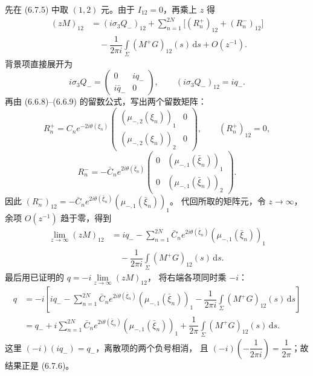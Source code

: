 \documentclass[lang=cn,scheme=chinese,mode=simple,device=normal,color=blue,
math=cm,thmcnt=section,12pt]{elegantbook}
\newcommand{\dd}{\,\mathrm{d}}
\begin{document}
\begin{callout}[计算：由 (6.7.5) 推导位势重构公式 (6.7.6)]
    先在 (6.7.5) 中取 $(1,2)$ 元。由于 $I_{12}=0$，再乘上 $z$ 得
    \[
        \begin{aligned}
            (zM)_{12}
             & =(i\sigma_3Q_-)_{12}
            +\sum\limits_{n=1}^{2N}\bigl[(R_n^+)_{12}+(R_n^-)_{12}\bigr]               \\
             & \quad-\dfrac{1}{2\pi i}\int\limits_\Sigma(M^+G)_{12}(s)\dd s+O(z^{-1}).
        \end{aligned}
    \]
    背景项直接展开为
    \[
        i\sigma_3Q_-=\begin{pmatrix}0&iq_-\\i\bar q_-&0\end{pmatrix},
        \qquad (i\sigma_3Q_-)_{12}=iq_-.
    \]
    再由 (6.6.8)--(6.6.9) 的留数公式，写出两个留数矩阵：
    \[
        R_n^+=C_ne^{-2i\theta(\xi_n)}
        \begin{pmatrix}
            (\mu_{-,2}(\xi_n))_1 & 0 \\(\mu_{-,2}(\xi_n))_2&0
        \end{pmatrix},\qquad (R_n^+)_{12}=0,
    \]
    \[
        R_n^-=-\bar C_ne^{2i\theta(\bar\xi_n)}
        \begin{pmatrix}
            0 & (\mu_{-,1}(\bar\xi_n))_1 \\0&(\mu_{-,1}(\bar\xi_n))_2
        \end{pmatrix}.
    \]
    因此 $(R_n^-)_{12}=-\bar C_ne^{2i\theta(\bar\xi_n)}(\mu_{-,1}(\bar\xi_n))_1$。
    代回所取的矩阵元，令 $z\to\infty$，余项 $O(z^{-1})$ 趋于零，得到
    \[
        \begin{aligned}
            \lim\limits_{z\to\infty}(zM)_{12}
             & =iq_--\sum\limits_{n=1}^{2N}\bar C_ne^{2i\theta(\bar\xi_n)}
            (\mu_{-,1}(\bar\xi_n))_1                                         \\
             & \quad-\dfrac{1}{2\pi i}\int\limits_\Sigma(M^+G)_{12}(s)\dd s.
        \end{aligned}
    \]
    最后用已证明的 $q=-i\displaystyle\lim\limits_{z\to\infty}(zM)_{12}$，
    将右端各项同时乘 $-i$：
    \[
        \begin{aligned}
            q & =-i\left[iq_--\sum\limits_{n=1}^{2N}\bar C_ne^{2i\theta(\bar\xi_n)}
                (\mu_{-,1}(\bar\xi_n))_1
            -\dfrac{1}{2\pi i}\int\limits_\Sigma(M^+G)_{12}(s)\dd s\right]          \\
              & =q_-+i\sum\limits_{n=1}^{2N}\bar C_ne^{2i\theta(\bar\xi_n)}
            (\mu_{-,1}(\bar\xi_n))_1
            +\dfrac{1}{2\pi}\int\limits_\Sigma(M^+G)_{12}(s)\dd s.
        \end{aligned}
    \]
    这里 $(-i)(iq_-)=q_-$，离散项的两个负号相消，
    且 $(-i)\left(-\dfrac{1}{2\pi i}\right)=\dfrac{1}{2\pi}$；故结果正是 (6.7.6)。
\end{callout}
\end{document}
